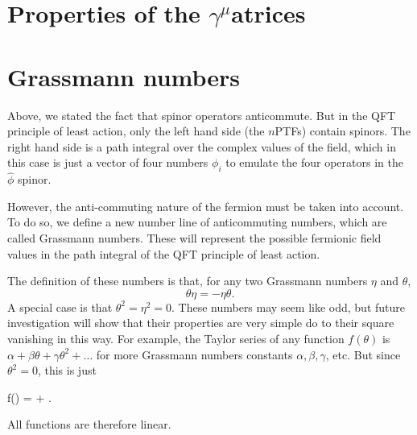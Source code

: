 \chapter{Properties of the \texorpdfstring{$\gamma^\mu$} matrices}
\label{app:gamma}
\chapter{Grassmann numbers}
\label{app:grassmann}
Above, we stated the fact that spinor operators anticommute. But in the QFT principle of least action, only the left hand side (the $n$PTFs) contain spinors. The right hand side is a path integral over the complex values of the field, which in this case is just a vector of four numbers $\phi_i$ to emulate the four operators in the $\hat \phi$ spinor.

However, the anti-commuting nature of the fermion must be taken into account. To do so, we define a new number line of anticommuting numbers, which are called Grassmann numbers. These will represent the possible fermionic field values in the path integral of the QFT principle of least action.

The definition of these numbers is that, for any two Grassmann numbers $\eta$ and $\theta$,
\begin{equation}
  \theta \eta = -\eta \theta.
\end{equation}
A special case is that $\theta^2 = \eta^2 = 0$. These numbers may seem like odd, but future investigation will show that their properties are very simple do to their square vanishing in this way. For example, the Taylor series of any function $f(\theta)$ is $\alpha + \beta\theta + \gamma\theta^2 + \dots$ for more Grassmann numbers constants $\alpha,\beta,\gamma$, etc. But since $\theta^2 = 0$, this is just 
\begin{e}
  f(\theta) = \alpha +  \beta\theta.
\end{e}
All functions are therefore linear.

